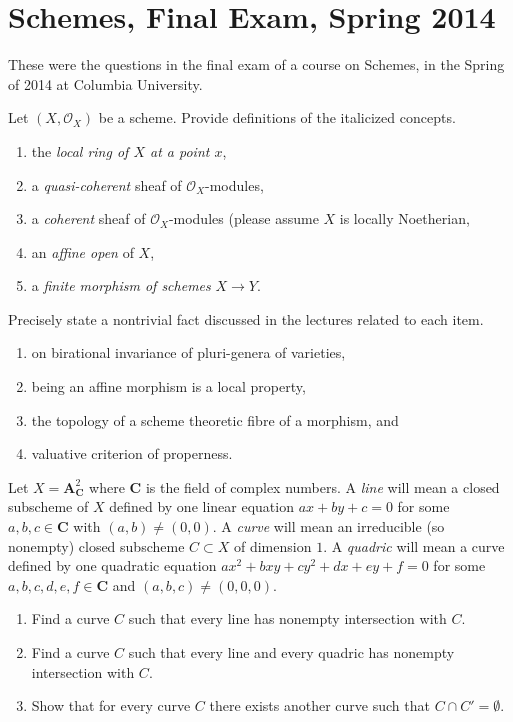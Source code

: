 \section{Schemes, Final Exam, Spring 2014}
\label{section-final-exam-spring-2014}

\noindent
These were the questions in the final exam of a course on
Schemes, in the Spring of 2014 at Columbia University.

\begin{exercise}[Definitions]
\label{exercise-definitions-spring-2014}
Let $(X, \mathcal{O}_X)$ be a scheme. Provide definitions of the
italicized concepts.
\begin{enumerate}
\item the {\it local ring of $X$ at a point $x$},
\item a {\it quasi-coherent} sheaf of $\mathcal{O}_X$-modules,
\item a {\it coherent} sheaf of $\mathcal{O}_X$-modules (please
assume $X$ is locally Noetherian,
\item an {\it affine open} of $X$,
\item a {\it finite morphism of schemes} $X \to Y$.
\end{enumerate}
\end{exercise}

\begin{exercise}[Theorems]
\label{exercise-results-spring-2014}
Precisely state a nontrivial fact discussed in the lectures related
to each item.
\begin{enumerate}
\item on birational invariance of pluri-genera of varieties,
\item being an affine morphism is a local property,
\item the topology of a scheme theoretic fibre of a morphism, and
\item valuative criterion of properness.
\end{enumerate}
\end{exercise}

\begin{exercise}
\label{exercise-miss-curve}
Let $X = \mathbf{A}^2_\mathbf{C}$ where $\mathbf{C}$ is the field
of complex numbers. A {\it line} will mean a closed
subscheme of $X$ defined by one linear equation $ax + by + c = 0$ for
some $a, b, c \in \mathbf{C}$ with $(a, b) \not = (0, 0)$.
A {\it curve} will mean an irreducible (so nonempty) closed subscheme
$C \subset X$ of dimension $1$.
A {\it quadric} will mean a curve defined by one
quadratic equation $ax^2 + bxy + cy^2 + dx + ey + f = 0$
for some $a, b, c, d, e, f \in \mathbf{C}$ and
$(a, b, c) \not = (0, 0, 0)$.
\begin{enumerate}
\item Find a curve $C$ such that every line has nonempty intersection with $C$.
\item Find a curve $C$ such that every line and every quadric has nonempty
intersection with $C$.
\item Show that for every curve $C$ there exists another curve
such that $C \cap C' = \emptyset$.
\end{enumerate}
\end{exercise}

